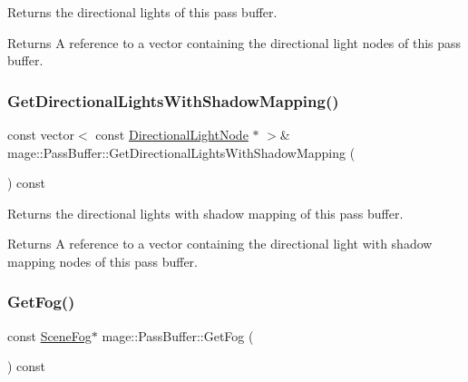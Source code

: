 Returns the directional lights of this pass buffer.

\begin{DoxyReturn}{Returns}
A reference to a vector containing the directional light nodes of this pass buffer. 
\end{DoxyReturn}
\hypertarget{structmage_1_1_pass_buffer_aaa5990e167c1f729f7c83bc4b12848cb}{}\label{structmage_1_1_pass_buffer_aaa5990e167c1f729f7c83bc4b12848cb} 
\subsubsection{\texorpdfstring{Get\+Directional\+Lights\+With\+Shadow\+Mapping()}{GetDirectionalLightsWithShadowMapping()}}
{\footnotesize\ttfamily const vector$<$ const \hyperlink{namespacemage_a7637b5351fc0f66a10badd80ebb35899}{Directional\+Light\+Node} $\ast$ $>$\& mage\+::\+Pass\+Buffer\+::\+Get\+Directional\+Lights\+With\+Shadow\+Mapping (\begin{DoxyParamCaption}{ }\end{DoxyParamCaption}) const\hspace{0.3cm}{\ttfamily [noexcept]}}

Returns the directional lights with shadow mapping of this pass buffer.

\begin{DoxyReturn}{Returns}
A reference to a vector containing the directional light with shadow mapping nodes of this pass buffer. 
\end{DoxyReturn}
\hypertarget{structmage_1_1_pass_buffer_a406b7dcb655d3689f0a4400edc2e9bf8}{}\label{structmage_1_1_pass_buffer_a406b7dcb655d3689f0a4400edc2e9bf8} 
\subsubsection{\texorpdfstring{Get\+Fog()}{GetFog()}}
{\footnotesize\ttfamily const \hyperlink{structmage_1_1_scene_fog}{Scene\+Fog}$\ast$ mage\+::\+Pass\+Buffer\+::\+Get\+Fog (\begin{DoxyParamCaption}{ }\end{DoxyParamCaption}) const\hspace{0.3cm}{\ttfamily [noexcept]}}

